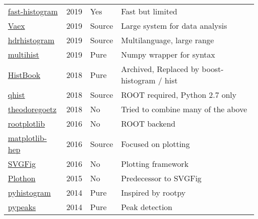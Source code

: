 \documentclass{webofc}
\begin{document}
\begin{table}
\begin{tabular}{llll}
		\href{https://github.com/astrofrog/fast-histogram}{fast-histogram}           & 2019         & Yes    & Fast but limited                                     \\
		\href{https://vaex.io}{Vaex}                                                 & 2019         & Source & Large system for data analysis                       \\
		\href{https://pypi.org/project/hdrhistogram/}{hdrhistogram}                  & 2019         & Source & Multilanguage, large range                           \\
		\href{https://pypi.org/project/multihist/}{multihist}                        & 2019         & Pure   & Numpy wrapper for syntax                             \\
		\href{https://github.com/scikit-hep/histbook}{HistBook}                      & 2018         & Pure   & Archived, Replaced by boost-histogram / hist         \\
		\href{https://pypi.org/project/qhist/}{qhist}                                & 2018         & Source & ROOT required, Python 2.7 only                       \\
		\href{https://github.com/theodoregoetz/histogram}{theodoregoetz}             & 2018         & No     & Tried to combine many of the above                   \\
		\href{https://github.com/drdavis/rootplotlib}{rootplotlib}                   & 2016         & No     & ROOT backend                                         \\
		\href{https://pypi.org/project/matplotlib-hep/}{matplotlib-hep}              & 2016         & Source & Focused on plotting                                  \\
		\href{https://github.com/jpivarski/svgfig}{SVGFig}                           & 2016         & No     & Plotting framework                                   \\
		\href{https://github.com/jpivarski/plothon}{Plothon}                         & 2015         & No     & Predecessor to SVGFig                                \\
		\href{https://pypi.org/project/pyhistogram/}{pyhistogram}                    & 2014         & Pure   & Inspired by rootpy                                   \\
		\href{https://pypi.org/project/pypeaks}{pypeaks}                             & 2014         & Pure   & Peak detection                                       \\

\end{tabular}
\end{table}
\end{document}
